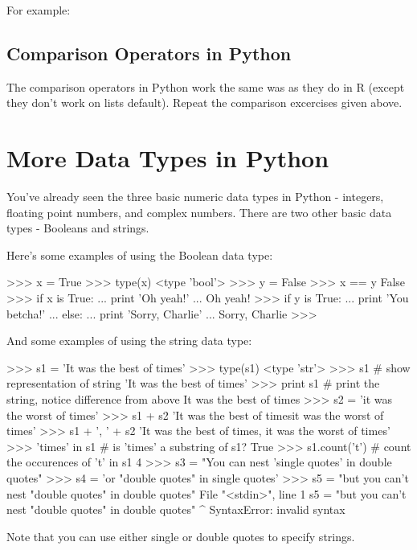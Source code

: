 For example:
%

\subsection{Comparison Operators in Python}

The comparison operators in Python work the same was as they do in R
(except they don't work on lists default). Repeat the comparison
excercises given above.

\section{More Data Types in Python}

You've already seen the three basic numeric data types in Python -
integers, floating point numbers, and complex numbers. There are two
other basic data types - Booleans and strings.

Here's some examples of using the Boolean data type:

\begin{python}
>>> x = True
>>> type(x)
<type 'bool'>
>>> y = False
>>> x == y
False
>>> if x is True:
...     print 'Oh yeah!'
... 
Oh yeah!
>>> if y is True:
...     print 'You betcha!'
... else:
...     print 'Sorry, Charlie'
... 
Sorry, Charlie
>>>
\end{python}
%
And some examples of using the string data type:
%
\begin{python}
>>> s1 = 'It was the best of times'
>>> type(s1)
<type 'str'>
>>> s1  # show representation of string
'It was the best of times'
>>> print s1  # print the string, notice difference from above
It was the best of times
>>> s2 = 'it was the worst of times'
>>> s1 + s2
'It was the best of timesit was the worst of times'
>>> s1 + ', ' + s2
'It was the best of times, it was the worst of times'
>>> 'times' in s1  # is 'times' a substring of s1?
True
>>> s1.count('t')  # count the occurences of 't' in s1
4
>>> s3 = "You can nest 'single quotes' in double quotes"
>>> s4 = 'or "double quotes" in single quotes'
>>> s5 = "but you can't nest "double quotes" in double quotes"
  File "<stdin>", line 1
    s5 = "but you can't nest "double quotes" in double quotes"
                                   ^
SyntaxError: invalid syntax
\end{python}
%
Note that you can use either single or double quotes to specify strings.


